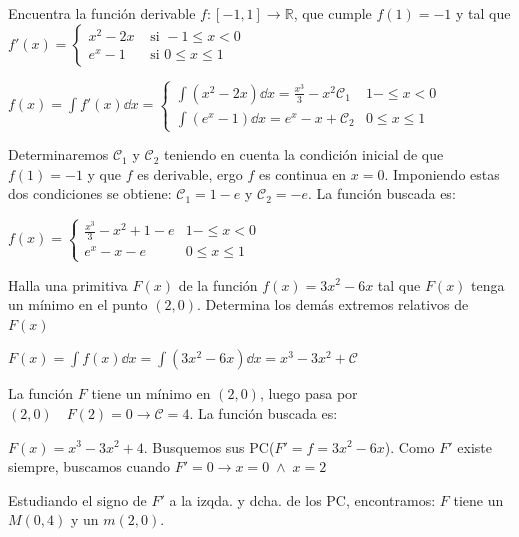 {\begin{ejem}
\end{ejem}

\begin{ejem}
Encuentra la función derivable $f:[-1,1]\to \mathbb R$, que cumple $f(1)=-1$ y tal que 
$f'(x)=\begin{cases}
x^2-2x & \text{ si } -1\le x <0 \\
e^x-1 & \text{ si } 0\le x \le 1	
\end{cases}$

\vspace{3mm}

$\displaystyle f(x)= \int f'(x) \dd x = 
\begin{cases}
 \int (x^2-2x)\dd x = \frac {x^3}{3}	 - x^2 \mathcal C_1 & 1-\le x < 0 \\
\int (e^x-1) \dd x = e^x -x + \mathcal C_2 & 0\le x \le 1
\end{cases}$

Determinaremos $\mathcal C_1$ y  $\mathcal C_2$ teniendo en cuenta la condición inicial de que $f(1)=-1$ y que $f$ es derivable, ergo $f$ es continua en $x=0$. Imponiendo estas dos condiciones se obtiene:  $\mathcal C_1=1-e$ y  $\mathcal C_2=-e$. La función buscada es:


$\displaystyle f(x) =
\begin{cases}
\frac {x^3}{3}	 - x^2 +1-e & 1-\le x < 0 \\
 e^x -x -e & 0\le x \le 1
\end{cases}$

\end{ejem}

\begin{ejem}
Halla una primitiva $F(x)$ de la función $f(x)=3x^2-6x$ tal que $F(x)$ tenga un mínimo en el punto $(2,0)$. Determina los demás extremos relativos de $F(x)$

\vspace{3mm}

$\displaystyle F(x)= \int f(x) \dd x = \int (3x^2-6x)\dd x= x^3-3x^2+\mathcal C$

La función $F$ tiene un mínimo en $(2,0)$, luego pasa por $(2,0) \quad F(2)=0 \to \mathcal C=4$. La función buscada es:

$F(x)=x^3-3x^2+4$. Busquemos sus PC($F'=f=3x^2-6x$). Como $F'$ existe siempre, buscamos cuando $F'=0 \to x=0 \; \wedge \; x=2$

Estudiando el signo de $F'$  a la izqda. y dcha. de los PC, encontramos: $F$ tiene un $M(0,4)$ y un $m(2,0)$.

\end{ejem}

}
